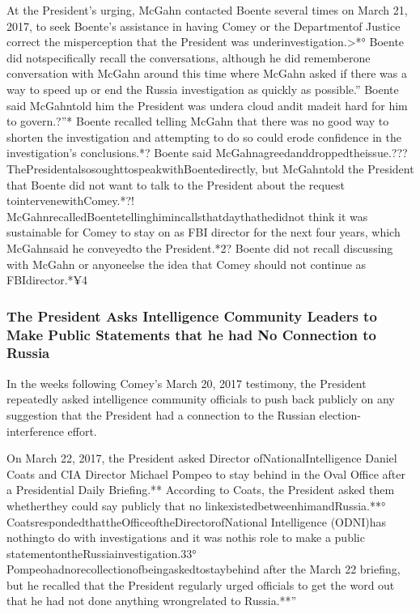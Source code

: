 At the President’s urging, McGahn contacted Boente several times on March 21, 2017, to seek Boente’s assistance in having Comey or the Departmentof Justice correct the misperception that the President was underinvestigation.>*° Boente did notspecifically recall the conversations, although he did rememberone conversation with McGahn around this time where McGahn asked if there was a way to speed up or end the Russia investigation as quickly as possible.” Boente said McGahntold him the President was undera cloud andit madeit hard for him to govern.?”* Boente recalled telling McGahn that there was no good way to shorten the investigation and attempting to do so could erode confidence in the investigation’s conclusions.*? Boente said McGahnagreedanddroppedtheissue.??? ThePresidentalsosoughttospeakwithBoentedirectly, but McGahntold the President that Boente did not want to talk to the President about the request tointervenewithComey.*?! McGahnrecalledBoentetellinghimincallsthatdaythathedidnot think it was sustainable for Comey to stay on as FBI director for the next four years, which McGahnsaid he conveyedto the President.*2? Boente did not recall discussing with McGahn or anyoneelse the idea that Comey should not continue as FBIdirector.*¥4

\subsubsection{The President Asks Intelligence Community Leaders to Make Public Statements that he had No Connection to Russia}

In the weeks following Comey’s March 20, 2017 testimony, the President repeatedly asked intelligence community officials to push back publicly on any suggestion that the President had a connection to the Russian election-interference effort.

On March 22, 2017, the President asked Director ofNationalIntelligence Daniel Coats and CIA Director Michael Pompeo to stay behind in the Oval Office after a Presidential Daily Briefing.** According to Coats, the President asked them whetherthey could say publicly that no linkexistedbetweenhimandRussia.**° CoatsrespondedthattheOfficeoftheDirectorofNational Intelligence (ODNI)has nothingto do with investigations and it was nothis role to make a public statementontheRussiainvestigation.33° Pompeohadnorecollectionofbeingaskedtostaybehind after the March 22 briefing, but he recalled that the President regularly urged officials to get the word out that he had not done anything wrongrelated to Russia.**”

